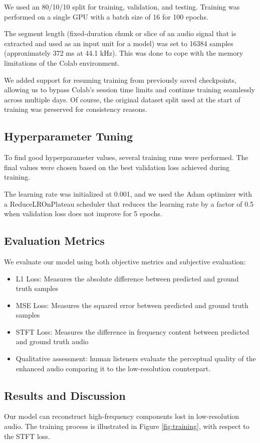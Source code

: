 \documentclass{article}
\begin{document}
We used an 80/10/10 split for training, validation, and testing. Training was performed on a single GPU with a batch size of 16 for 100 epochs.

The segment length (fixed-duration chunk or slice of an audio signal that is extracted and used as an input unit for a model) was set to 16384 samples (approximately 372 ms at 44.1 kHz).
This was done to cope with the memory limitations of the Colab environment.

We added support for resuming training from previously saved checkpoints, allowing us to bypass Colab's session time limits and continue training seamlessly across multiple days.
Of course, the original dataset split used at the start of training was preserved for consistency reasons.

\subsection{Hyperparameter Tuning}
To find good hyperparameter values, several training runs were performed.
The final values were chosen based on the best validation loss achieved during training.  

The learning rate was initialized at 0.001, and we used the Adam optimizer with a ReduceLROnPlateau scheduler that reduces the learning rate by a factor of 0.5 when validation loss does not improve for 5 epochs.

\subsection{Evaluation Metrics}
We evaluate our model using both objective metrics and subjective evaluation:
\begin{itemize}
    \item L1 Loss: Measures the absolute difference between predicted and ground truth samples
    \item MSE Loss: Measures the squared error between predicted and ground truth samples
    \item STFT Loss: Measures the difference in frequency content between predicted and ground truth audio
    \item Qualitative assessment: human listeners evaluate the perceptual quality of the enhanced audio comparing it to the low-resolution counterpart.
\end{itemize}

\subsection{Results and Discussion}
Our model can reconstruct high-frequency components lost in low-resolution audio. 
The training process is illustrated in Figure \ref{fig:training}, with respect to the STFT loss.
\end{document}
